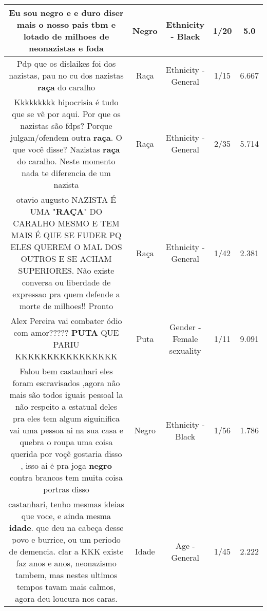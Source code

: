 \documentclass[11pt]{article}
\newlength\mylength
\begin{document}
\begin{center}
\begin{longtable}{|C{.65\mylength}|C{.30\mylength}|C{.12\mylength}|C{.12\mylength}|C{.12\mylength}|}
  \small Eu sou \textbf{negro} e e duro diser mais o nosso pais tbm e lotado de milhoes de neonazistas e foda\normalsize   & Negro & Ethnicity - Black & 1/20 & 5.0 \\  \hline
  \small Pdp que os dislaikes foi dos nazistas, pau no cu dos nazistas \textbf{raça} do caralho\normalsize   & Raça & Ethnicity - General & 1/15 & 6.667 \\  \hline
  \small Kkkkkkkkk hipocrisia é tudo que se vê por aqui. Por que os nazistas são fdps? Porque julgam/ofendem outra \textbf{raça}.  O que você disse? Nazistas \textbf{raça} do caralho. Neste momento nada te diferencia de um nazista\normalsize   & Raça & Ethnicity - General & 2/35 & 5.714 \\  \hline
  \small otavio augusto  NAZISTA É UMA "\textbf{RAÇA}" DO CARALHO MESMO E TEM MAIS É QUE SE FUDER PQ ELES QUEREM O MAL DOS OUTROS E SE ACHAM SUPERIORES. Não existe conversa ou liberdade de expressao pra quem defende a morte de milhoes!! Pronto\normalsize   & Raça & Ethnicity - General & 1/42 & 2.381 \\  \hline
  \small Alex Pereira vai combater ódio com amor????? \textbf{PUTA} QUE PARIU KKKKKKKKKKKKKKKK\normalsize   & Puta & Gender - Female sexuality & 1/11 & 9.091 \\  \hline
  \small Falou bem castanhari eles foram escravisados ,agora não mais são todos iguais pessoal la não respeito a estatual deles pra eles tem algum siguinifica vai uma pessoa ai na sua casa e quebra o roupa uma coisa querida por voçê gostaria disso , isso ai ė pra joga \textbf{negro} contra brancos tem muita coisa portras disso\normalsize   & Negro & Ethnicity - Black & 1/56 & 1.786 \\  \hline
  \small castanhari, tenho mesmas ideias que voce, e ainda mesma \textbf{idade}. que deu na cabeça desse povo e burrice, ou um periodo de demencia. clar a KKK existe faz anos e anos, neonazismo tambem, mas nestes ultimos tempos tavam mais calmos, agora deu loucura nos caras.\normalsize   & Idade & Age - General & 1/45 & 2.222 \\  \hline

\end{longtable}
\end{center}
\end{document}
